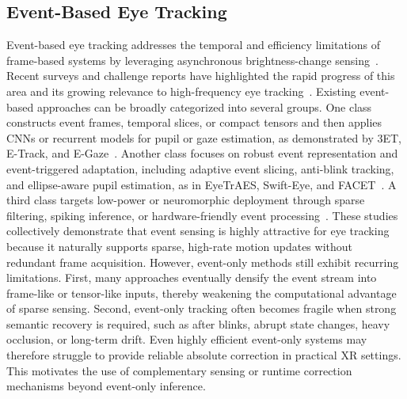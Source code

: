 \documentclass[journal]{IEEEtran}
\begin{document}
\subsection{Event-Based Eye Tracking}
Event-based eye tracking addresses the temporal and efficiency limitations of frame-based systems by leveraging asynchronous brightness-change sensing~\cite{lenero20113}. Recent surveys and challenge reports have highlighted the rapid progress of this area and its growing relevance to high-frequency eye tracking~\cite{wang2024event,chen2025event}. Existing event-based approaches can be broadly categorized into several groups. One class constructs event frames, temporal slices, or compact tensors and then applies CNNs or recurrent models for pupil or gaze estimation, as demonstrated by 3ET, E-Track, and E-Gaze~\cite{chen20233et,li2023track,li2024gaze}. Another class focuses on robust event representation and event-triggered adaptation, including adaptive event slicing, anti-blink tracking, and ellipse-aware pupil estimation, as in EyeTrAES, Swift-Eye, and FACET~\cite{sen2024eyetraes,zhang2024swift,ding2025facet}. A third class targets low-power or neuromorphic deployment through sparse filtering, spiking inference, or hardware-friendly event processing~\cite{lai2026efficient,sui2026event,bonazzi2024retina}.
%
These studies collectively demonstrate that event sensing is highly attractive for eye tracking because it naturally supports sparse, high-rate motion updates without redundant frame acquisition. However, event-only methods still exhibit recurring limitations. First, many approaches eventually densify the event stream into frame-like or tensor-like inputs, thereby weakening the computational advantage of sparse sensing. Second, event-only tracking often becomes fragile when strong semantic recovery is required, such as after blinks, abrupt state changes, heavy occlusion, or long-term drift. Even highly efficient event-only systems may therefore struggle to provide reliable absolute correction in practical XR settings. This motivates the use of complementary sensing or runtime correction mechanisms beyond event-only inference.
%
\end{document}

